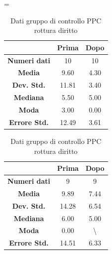 \begin{table}
\centering
\setlength\tabcolsep{4pt}
\begin{minipage}{0.48\textwidth}
\centering
\tablewidth=\textwidth

\begin{tabular}{|c|c|c|} \hline
{\textbf{}} & {\textbf{  \hspace{8pt}Prima\hspace{8pt} }} & {\textbf{ \hspace{8pt}Dopo\hspace{8pt}  }}\\ \hline
\textbf{Numeri dati} & 10 & 10 \\ 
\textbf{Media} & 9.60 & 4.30 \\  
\textbf{Dev. Std.} & 11.81 & 3.40 \\  
\textbf{Mediana} & 5.50 & 5.00 \\ 
\textbf{Moda} & 3.00 & 0.00 \\ 
\textbf{Errore Std.} & 12.49 & 3.61 \\ 
\hline
\end{tabular}
\caption{Dati gruppo sperimentale PPC rottura diritto}

\label{tab:accuracy} 
\end{minipage}%
\hfill
\begin{minipage}{0.48\textwidth}
\centering

\begin{tabular}{|c|c|c|} \hline
{\textbf{}} & {\textbf{  \hspace{8pt}Prima\hspace{8pt} }} & {\textbf{ \hspace{8pt}Dopo\hspace{8pt}  }}\\ \hline
\textbf{Numeri dati} & 9 & 9 \\ 
\textbf{Media} & 9.89 & 7.44 \\  
\textbf{Dev. Std.} & 14.28 & 6.54 \\  
\textbf{Mediana} & 6.00 & 5.00 \\  
\textbf{Moda} & 0.00 & \textbackslash \\
\textbf{Errore Std.} & 14.51 & 6.33 \\
\hline
\end{tabular}
\caption{Dati gruppo di controllo PPC rottura diritto}

 \label{tab:ompdiff} 
\end{minipage}
\end{table}
